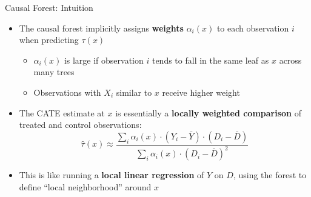 \documentclass[hyperref={pdfpagelabels=false}]{beamer}
\begin{document}
\begin{frame}{Causal Forest: Intuition}
	\begin{itemize}
		\item The causal forest implicitly assigns \textbf{weights} $\alpha_i(x)$ to each observation $i$ when predicting $\tau(x)$
		\vspace{0.2cm}
		\begin{itemize}
			\item $\alpha_i(x)$ is large if observation $i$ tends to fall in the same leaf as $x$ across many trees
			\vspace{0.2cm}
			\item Observations with $X_i$ similar to $x$ receive higher weight
		\end{itemize}
		\vspace{0.3cm}
		\item The CATE estimate at $x$ is essentially a \textbf{locally weighted comparison} of treated and control observations:
		\begin{equation*}
			\hat{\tau}(x) \approx \frac{\sum_i \alpha_i(x) \cdot (Y_i - \bar{Y}) \cdot (D_i - \bar{D})}{\sum_i \alpha_i(x) \cdot (D_i - \bar{D})^2}
		\end{equation*}
		\item This is like running a \textbf{local linear regression} of $Y$ on $D$, using the forest to define ``local neighborhood'' around $x$
	\end{itemize}
\end{frame}
\end{document}
